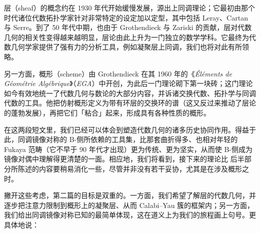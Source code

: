 层（sheaf）的概念约在 1930 年代开始缓慢发展，源出上同调理论；它最初由那个时代诸位代数拓扑学家针对非常特定的设定加以定型，其中包括 Leray、Cartan 与 Serre。到了 50 年代中期，也由于 Grothendieck 与 Zariski 的贡献，层对代数几何的相关性变得越来越明显，层论由此上升为一门独立的数学学科。它最终为代数几何学家提供了强有力的分析工具，例如凝聚层上同调，我们也将对此有所领略。

另一方面，概形（scheme）由 Grothendieck 在其 1960 年的《\textit{Éléments de Géométrie Algébrique}》（\textit{EGA}）中开创，为此后一门理论砌下第一块砖；这门理论如今有效地统一了代数几何与数论的大部分内容，并诉诸交换代数、拓扑学与同调代数的工具。他把仿射概形定义为带有环层的交换环的谱（这又反过来推动了层论的蓬勃发展），再把它们「粘合」起来，形成具有各种性质的概形。

在这两段短文里，我们已经可以体会到塑造代数几何的诸多历史协同作用。得益于此，同调镜像对称的 B-侧所依赖的工具集，比那套曲折得多、也相对年轻的 Fukaya 范畴（它不早于 90 年代才出现）更为传统、更为坚实，从而使 B-侧成为镜像对偶中理解得更清楚的一面。相应地，我们将看到，接下来的理论比 \cite{[Imp21]} 后半部分所陈述的内容要稍易消化一些，尽管并非没有若干妥协，尤其是在涉及概形之时。

撇开这些考虑，第二篇的目标是双重的。一方面，我们希望了解层的代数几何，并逐步把注意力限制到概形上的凝聚层、从而 Calabi--Yau 簇的框架内；另一方面，我们给出同调镜像对称已知的最简单体现，这在道义上为我们的旅程画上句号。更具体地说：

